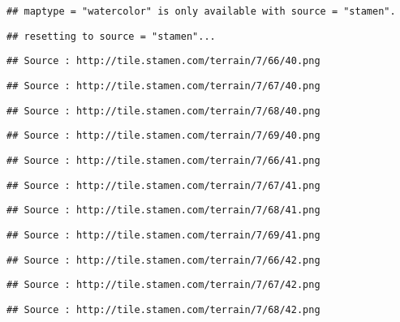 \documentclass[]{article}
\begin{document}
\begin{verbatim}
## maptype = "watercolor" is only available with source = "stamen".
\end{verbatim}

\begin{verbatim}
## resetting to source = "stamen"...
\end{verbatim}

\begin{verbatim}
## Source : http://tile.stamen.com/terrain/7/66/40.png
\end{verbatim}

\begin{verbatim}
## Source : http://tile.stamen.com/terrain/7/67/40.png
\end{verbatim}

\begin{verbatim}
## Source : http://tile.stamen.com/terrain/7/68/40.png
\end{verbatim}

\begin{verbatim}
## Source : http://tile.stamen.com/terrain/7/69/40.png
\end{verbatim}

\begin{verbatim}
## Source : http://tile.stamen.com/terrain/7/66/41.png
\end{verbatim}

\begin{verbatim}
## Source : http://tile.stamen.com/terrain/7/67/41.png
\end{verbatim}

\begin{verbatim}
## Source : http://tile.stamen.com/terrain/7/68/41.png
\end{verbatim}

\begin{verbatim}
## Source : http://tile.stamen.com/terrain/7/69/41.png
\end{verbatim}

\begin{verbatim}
## Source : http://tile.stamen.com/terrain/7/66/42.png
\end{verbatim}

\begin{verbatim}
## Source : http://tile.stamen.com/terrain/7/67/42.png
\end{verbatim}

\begin{verbatim}
## Source : http://tile.stamen.com/terrain/7/68/42.png
\end{verbatim}
\end{document}
